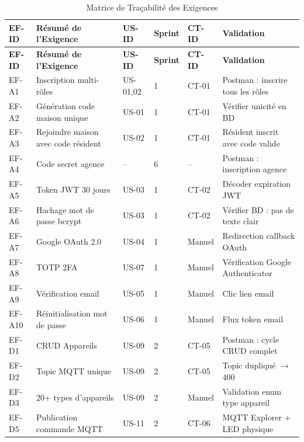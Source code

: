 \begin{center}
\begin{longtable}{p{} p{} p{} p{} p{} p{}}
\caption{Matrice de Traçabilité des Exigences}\label{tab:rtm}\\
\toprule
\textbf{EF-ID} & \textbf{Résumé de l'Exigence} & \textbf{US-ID} & \textbf{Sprint} & \textbf{CT-ID} & \textbf{Validation} \\
\midrule
\endfirsthead
\toprule
\textbf{EF-ID} & \textbf{Résumé de l'Exigence} & \textbf{US-ID} & \textbf{Sprint} & \textbf{CT-ID} & \textbf{Validation} \\
\midrule
\endhead
\bottomrule
\endfoot
EF-A1  & Inscription multi-rôles         & US-01,02 & 1 & CT-01 & Postman : inscrire tous les rôles \\
EF-A2  & Génération code maison unique   & US-01    & 1 & CT-01 & Vérifier unicité en BD \\
EF-A3  & Rejoindre maison avec code résident & US-02 & 1 & CT-01 & Résident inscrit avec code valide \\
EF-A4  & Code secret agence              & --       & 6 & --    & Postman : inscription agence \\
EF-A5  & Token JWT 30 jours              & US-03    & 1 & CT-02 & Décoder expiration JWT \\
EF-A6  & Hachage mot de passe bcrypt     & US-03    & 1 & CT-02 & Vérifier BD : pas de texte clair \\
EF-A7  & Google OAuth 2.0                & US-04    & 1 & Manuel& Redirection callback OAuth \\
EF-A8  & TOTP 2FA                        & US-07    & 1 & Manuel& Vérification Google Authenticator \\
EF-A9  & Vérification email              & US-05    & 1 & Manuel& Clic lien email \\
EF-A10 & Réinitialisation mot de passe   & US-06    & 1 & Manuel& Flux token email \\
EF-D1  & CRUD Appareils                  & US-09    & 2 & CT-05 & Postman : cycle CRUD complet \\
EF-D2  & Topic MQTT unique               & US-09    & 2 & CT-05 & Topic dupliqué $\to$ 400 \\
EF-D3  & 20+ types d'appareils           & US-09    & 2 & Manuel& Validation enum type appareil \\
EF-D5  & Publication commande MQTT       & US-11    & 2 & CT-06 & MQTT Explorer + LED physique \\

\end{longtable}
\end{center}
